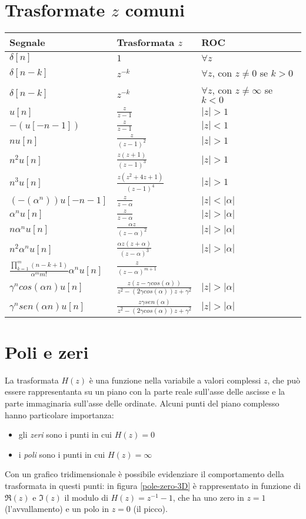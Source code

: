 \section{Trasformate $z$ comuni}
\begin{tabular}{l|l|l}

Segnale & Trasformata $z$ & ROC \\
\hline
$\delta [n]$ & $1$ & $\forall z$ \\
$\delta [n-k]$ & $z^{-k}$ & $\forall z$, con $z\ne 0$ se $k>0$ \\
$\delta [n-k]$ & $z^{-k}$ & $\forall z$, con $z\ne \infty$ se $k<0$ \\
$u[n]$ & $\frac{z}{z-1}$ & $|z| > 1$ \\ 
$-(u[-n-1])$ & $\frac{z}{z-1}$ & $|z| < 1$ \\
$nu[n]$ & $\frac{z}{(z-1)^2}$ & $|z| > 1$ \\
$n^2 u[n]$ & $\frac{z(z+1)}{(z-1)^3}$ & $|z| > 1$ \\
$n^3 u[n]$ & $\frac{z(z^2 +4z +1)}{(z-1)^4}$ & $|z| > 1$ \\
$\left ( -\left(\alpha^n\right ) \right)u[-n-1]$ & $\frac{z}{z-\alpha}$ & $|z|<|\alpha|$ \\
$\alpha^n u[n]$ & $\frac{z}{z-\alpha}$ & $|z|>|\alpha|$ \\
$n\alpha^n u[n]$ & $\frac{\alpha z}{(z-\alpha)^2}$ & $|z|>|\alpha|$ \\
$n^2\alpha^n u[n]$ & $\frac{\alpha z(z+\alpha)}{(z-\alpha)^3}$ & $|z|>|\alpha|$ \\
$\frac{\prod_{k=1}^m (n-k+1)}{\alpha^m m!}\alpha^n u[n]$ & $\frac{z}{(z-\alpha)^{m+1}}$ \\
$\gamma^n cos(\alpha n)u[n]$ & $\frac{z(z-\gamma cos(\alpha))}{z^2 - (2\gamma cos(\alpha))z+\gamma^2}$ & $|z|>|\alpha|$ \\
$\gamma^n sen(\alpha n)u[n]$ & $\frac{z\gamma sen(\alpha)}{z^2 - (2\gamma cos(\alpha))z+\gamma^2}$ & $|z|>|\alpha|$
\end{tabular}

\section{Poli e zeri}
La trasformata $H(z)$ \`e una funzione nella variabile a valori complessi $z$, che pu\`o essere rappresentanta su un piano con la parte reale sull'asse delle ascisse e la parte immaginaria sull'asse delle ordinate.
Alcuni punti del piano complesso hanno particolare importanza:
\begin{itemize}
\item gli \emph{zeri} sono i punti in cui $H(z)=0$ 
\item i \emph{poli} sono i punti in cui $H(z)=\infty$
\end{itemize}
Con un grafico tridimensionale \`e possibile evidenziare il comportamento della trasformata in questi punti: in figura \ref{pole-zero-3D} \`e rappresentato in funzione di $\Re(z)$ e $\Im(z)$ il modulo di $H(z)=z^{-1}-1$, che ha uno zero in $z=1$ (l'avvallamento) e un polo in $z=0$ (il picco).


